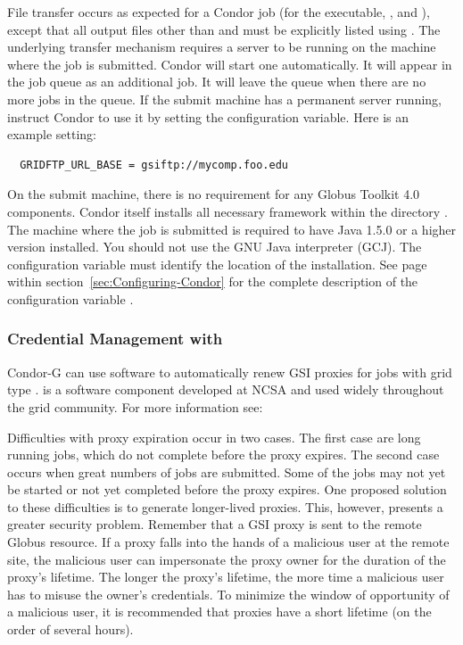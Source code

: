 File transfer occurs as expected for a Condor job 
(for the executable, , and ), except that all
output files other than  and  must be
explicitly listed using .
The underlying transfer mechanism requires a  server
to be running on the machine where the job
is submitted. Condor will start one automatically. It will appear in the
job queue as an additional job. It will leave the queue when there are
no more  jobs in the queue.
If the submit machine has a permanent  server running,
instruct Condor to use it by setting the 
configuration variable.  Here is an example setting:
\begin{verbatim}
  GRIDFTP_URL_BASE = gsiftp://mycomp.foo.edu
\end{verbatim}

On the submit machine,
there is no requirement for any Globus Toolkit 4.0 components.
Condor itself installs all necessary framework within the directory 
.
The machine where the job is submitted
is required to
have Java 1.5.0 or a higher version installed.
You should not use the GNU Java interpreter (GCJ).
The configuration variable 
must identify the location of the installation.
See page~\pageref{param:Java} within
section~\ref{sec:Configuring-Condor}
for the complete description of the configuration variable .


\subsubsection{\label{sec:My-Proxy}Credential Management with }
Condor-G can use 
software to automatically renew GSI proxies for
 jobs with grid type
.
 is a software component developed at
NCSA and used widely throughout the grid community.
For more information see:

Difficulties with proxy expiration occur in two cases.
The first case are long running jobs, which do not complete
before the proxy expires.
The second case occurs when great numbers of jobs are submitted.
Some of the jobs may not yet be started
or not yet completed before the proxy expires.
One proposed solution to these difficulties is to generate
longer-lived proxies.
This, however, presents a greater security problem.
Remember that a GSI proxy is sent to the remote Globus resource.
If a proxy falls into the hands of a malicious user at the remote site,
the malicious user can impersonate the proxy owner
for the duration of the proxy's lifetime.
The longer the proxy's lifetime,
the more time a malicious user has to misuse the owner's credentials.
To minimize the
window of opportunity of a
malicious user, 
it is recommended that proxies have a short lifetime
(on the order of several hours).

